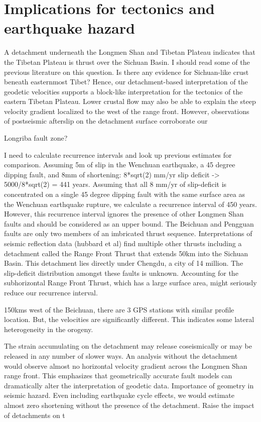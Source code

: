 \documentclass{article}
\begin{document}
\section{Implications for tectonics and earthquake hazard}
A detachment underneath the Longmen Shan and Tibetan Plateau indicates that the Tibetan Plateau is thrust over the Sichuan Basin. I should read some of the previous literature on this question. Is there any evidence for Sichuan-like crust beneath easternmost Tibet? 
Hence, our detachment-based interpretation of the geodetic velocities supports a block-like interpretation for the tectonics of the eastern Tibetan Plateau. Lower crustal flow may also be able to explain the steep velocity gradient localized to the west of the range front. However, observations of postseismic afterslip on the detachment surface corroborate our  

Longriba fault zone?

I need to calculate recurrence intervals and look up previous estimates for comparison. 
Assuming 5m of slip in the Wenchuan earthquake, a 45 degree dipping fault, and 8mm of shortening: 8*sqrt(2) mm/yr slip deficit -> 5000/8*sqrt(2) = 441 years.
Assuming that all 8 mm/yr of slip-deficit is concentrated on a single 45 degree dipping fault with the same surface area as the Wenchuan earthquake rupture, we calculate a recurrence interval of 450 years.
However, this recurrence interval ignores the presence of other Longmen Shan faults and should be considered as an upper bound. The Beichuan and Pengguan faults are only two members of an imbricated thrust sequence. Interpretations of seismic reflection data (hubbard et al) find multiple other thrusts including a detachment called the Range Front Thrust that extends 50km into the Sichuan Basin. This detachment lies directly under Chengdu, a city of 14 million. The slip-deficit distribution amongst these faults is unknown. Accounting for the subhorizontal Range Front Thrust, which has a large surface area, might seriously reduce our recurrence interval.

150kms west of the Beichuan, there are 3 GPS stations with similar profile location. But, the velocities are significantly different. This indicates some lateral heterogeneity in the orogeny.

The strain accumulating on the detachment may release coseismically or may be released in any number of slower ways. 
An analysis without the detachment would observe almost no horizontal velocity gradient across the Longmen Shan range front. This emphasizes that geometrically accurate fault models can dramatically alter the interpretation of geodetic data. 
Importance of geometry in seismic hazard. Even including earthquake cycle effects, we would estimate almost zero shortening without the presence of the detachment. Raise the impact of detachments on t
\end{document}

